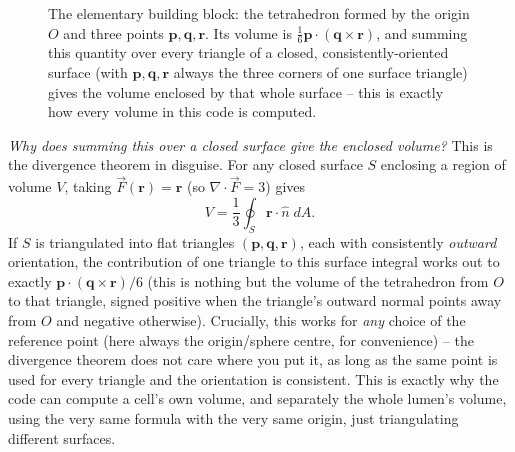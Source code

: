 \documentclass[11pt,a4paper]{report}
\newcommand{\rvec}{\mathbf{r}}
\newcommand{\pvec}{\mathbf{p}}
\newcommand{\qvec}{\mathbf{q}}
\begin{document}
\begin{figure}[h]
\centering
{}
\caption{The elementary building block: the tetrahedron formed by the
origin $O$ and three points $\pvec,\qvec,\rvec$. Its volume is
$\frac16 \pvec\cdot(\qvec\times\rvec)$, and summing this quantity over
every triangle of a closed, consistently-oriented surface (with
$\pvec,\qvec,\rvec$ always the three corners of one surface triangle)
gives the volume enclosed by that whole surface -- this is exactly how
every volume in this code is computed.}
\label{fig:tetra}
\end{figure}

\emph{Why does summing this over a closed surface give the enclosed
volume?} This is the divergence theorem in disguise. For any closed
surface $S$ enclosing a region of volume $V$, taking $\vec F(\rvec)=\rvec$
(so $\nabla\cdot\vec F = 3$) gives
\begin{equation}
  V = \frac{1}{3}\oint_S \rvec\cdot\hat n \; dA .
\end{equation}
If $S$ is triangulated into flat triangles $(\pvec,\qvec,\rvec)$, each with
consistently \emph{outward} orientation, the contribution of one
triangle to this surface integral works out to exactly
$\pvec\cdot(\qvec\times\rvec)/6$ (this is nothing but the volume of the
tetrahedron from $O$ to that triangle, signed positive when the
triangle's outward normal points away from $O$ and negative otherwise).
Crucially, this works for \emph{any} choice of the reference point
(here always the origin/sphere centre, for convenience) -- the
divergence theorem does not care where you put it, as long as the
same point is used for every triangle and the orientation is
consistent. This is exactly why the code can compute a cell's own
volume, and separately the whole lumen's volume, using the very same
formula with the very same origin, just triangulating different
surfaces.
\end{document}
